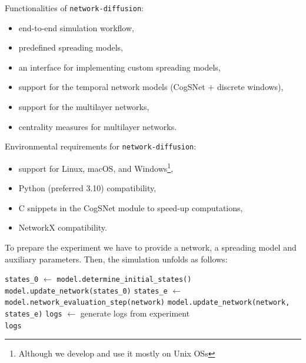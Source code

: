 \documentclass{beamer}
\begin{document}
\begin{frame}{\secname}
    Functionalities of \lstinline[style=py]{network-diffusion}:
    \vspace{1em}
    \begin{itemize}
        \item end-to-end simulation workflow,
        \item predefined spreading models,
        \item an interface for implementing custom spreading models,
        \item support for the temporal network models (CogSNet + discrete windows),
        \item support for the multilayer networks,
        \item centrality measures for multilayer networks.
    \end{itemize}
\end{frame}

\begin{frame}{\secname}
    Environmental requirements for \lstinline[style=py]{network-diffusion}:
    \vspace{1em}
    \begin{itemize}
        \item support for Linux, macOS, and Windows\footnote{Although we develop and use it mostly on Unix OSs},
        \item Python (preferred 3.10) compatibility,
        \item C snippets in the CogSNet module to speed-up computations,
        \item NetworkX compatibility.
    \end{itemize}
\end{frame}

\begin{frame}[fragile]{\secname}
    To prepare the experiment we have to provide a network, a spreading model and auxiliary parameters.
    Then, the simulation unfolds as follows:
    \begin{algorithmic}[1]
        \State \lstinline[style=py]{states_0} $\gets$ \lstinline[style=py]{model.determine_initial_states()}
        \State \lstinline[style=py]{model.update_network(states_0)} %
        \State \quad \quad \lstinline[style=py]{states_e} $\gets$ \lstinline[style=py]{model.network_evaluation_step(network)}
        \State \quad \quad \lstinline[style=py]{model.update_network(network, states_e)}
        \EndFor
        \State \lstinline[style=py]{logs} $\gets$ generate logs from experiment \\
        \Return \lstinline[style=py]{logs}
        \EndProcedure
    \end{algorithmic}
\end{frame}
\end{document}
